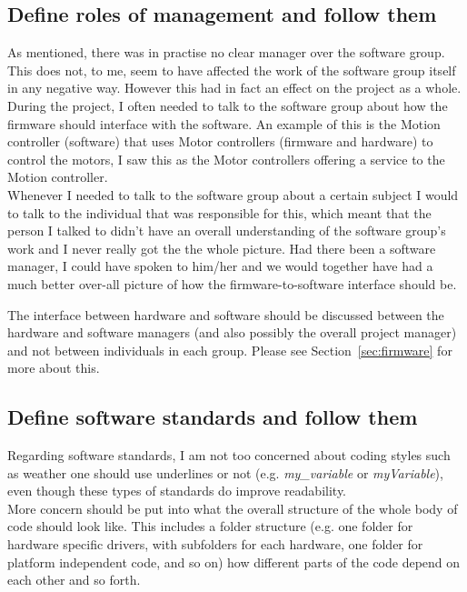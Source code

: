 \subsection{Define roles of management and follow them}\label{sec:roles}
As mentioned, there was in practise no clear manager over the software group. This does not, to me, seem to have affected the work of the software group itself in any negative way. However this had in fact an effect on the project as a whole. \\
During the project, I often needed to talk to the software group about how the firmware should interface with the software. An example of this is the Motion controller (software) that uses Motor controllers (firmware and hardware) to control the motors, I saw this as the Motor controllers offering a service to the Motion controller. \\
Whenever I needed to talk to the software group about a certain subject I would to talk to the individual that was responsible for this, which meant that the person I talked to didn't have an overall understanding of the software group's work and I never really got the the whole picture. Had there been a software manager, I could have spoken to him/her and we would together have had a much better over-all picture of how the firmware-to-software interface should be.

The interface between hardware and software should be discussed between the hardware and software managers (and also  possibly the overall project manager) and not between individuals in each group. Please see Section~\ref{sec:firmware} for more about this.


\subsection{Define software standards and follow them}\label{sec:software_standards}
Regarding software standards, I am not too concerned about coding styles such as weather one should use underlines or not (e.g. \emph{my\_variable} or \emph{myVariable}), even though these types of standards do improve readability. \\
More concern should be put into what the overall structure of the whole body of code should look like. This includes a folder structure (e.g. one folder for hardware specific drivers, with subfolders for each hardware, one folder for platform independent code, and so on) how different parts of the code depend on each other and so forth.

